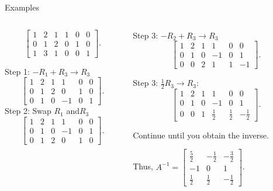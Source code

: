 \documentclass[10pt, aspectratio=169]{beamer}
\begin{document}
\begin{frame}{Examples}
{\begin{columns}
\begin{column}{0.6\textwidth}
\[
\left[\begin{array}{ccc|ccc}
1 & 2 & 1 & 1 & 0 & 0 \\
0 & 1 & 2 & 0 & 1 & 0 \\
1 & 3 & 1 & 0 & 0 & 1
\end{array}\right].
\]

Step 1: \(-R_1 + R_3 \to R_3\)
\[
\left[\begin{array}{ccc|ccc}
1 & 2 & 1 & 1 & 0 & 0 \\
0 & 1 & 2 & 0 & 1 & 0 \\
0 & 1 & 0 & -1 & 0 & 1
\end{array}\right].
\]
Step 2: Swap \(R_1\) and\( R_3\)
\[
\left[\begin{array}{ccc|ccc}
1 & 2 & 1 & 1 & 0 & 0 \\
0 & 1 & 0 & -1 & 0 & 1\\
0 & 1 & 2 & 0 & 1 & 0 
\end{array}\right].
\]
\end{column}

\begin{column}{0.5\textwidth}
Step 3: \(-R_2 +R_3 \to R_3\)
\[
\left[\begin{array}{ccc|ccc}
1 & 2 & 1 & 1 & 0 & 0 \\
0 & 1 & 0 & -1 & 0 & 1\\
0 & 0 & 2 & 1 & 1 & -1 
\end{array}\right].
\]

Step 3:  \(\frac{1}{2}R_3 \to R_3\):
\[
\left[\begin{array}{ccc|ccc}
1 & 2 & 1 & 1 & 0 & 0 \\
0 & 1 & 0 & -1 & 0 & 1\\
0 & 0 & 1 & \frac{1}{2} & \frac{1}{2} & -\frac{1}{2}
\end{array}\right].
\]

Continue until you obtain the inverse.

Thus, \(A^{-1} = \begin{bmatrix} \frac{5}{2} & -\frac{1}{2} & -\frac{3}{2} \\ -1 & 0 & 1 \\ \frac{1}{2} & \frac{1}{2} & -\frac{1}{2} \end{bmatrix}\).
\end{column}
\end{columns}
}



\end{frame}
\end{document}
